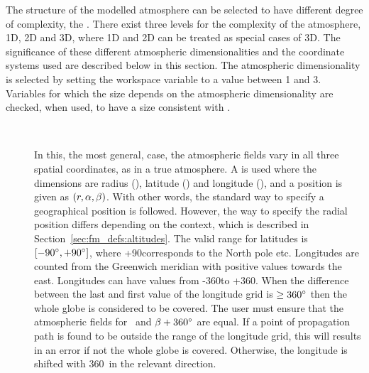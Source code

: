\label{sec:fm_defs:atmdim}

The structure of the modelled atmosphere can be selected to have different
degree of complexity, the . There
exist three levels for the complexity of the atmosphere, 1D, 2D and
3D, where 1D and 2D can be treated as special cases of 3D. The
significance of these different atmospheric dimensionalities and the
coordinate systems used are described below in this section. The
atmospheric dimensionality is selected by setting the workspace
variable  to a value between 1 and 3. Variables
for which the size depends on the atmospheric dimensionality are
checked, when used, to have a size consistent with
.

\begin{description}
  
\item[\,\,\,] In this, the most general, case, the
  atmospheric fields vary in all three spatial coordinates, as in a
  true atmosphere. A  is used where the
  dimensions are radius (\Rds), latitude (\Lat) and longitude (\Lon),
  and a position is given as $(r,\alpha,\beta)$. With other words, the
  standard way to specify a geographical position is followed.
  However, the way to specify the radial position differs depending on
  the context, which is described in
  Section~\ref{sec:fm_defs:altitudes}. The valid range for latitudes
  is $[-90^\circ,+90^\circ]$, where +90\degree corresponds to the
  North pole etc. Longitudes are counted from the Greenwich meridian
  with positive values towards the east. Longitudes can have values
  from -360\degree to +360\degree. When the difference between the
  last and first value of the longitude grid is $\geq 360^\circ$ then
  the whole globe is considered to be covered. The user must ensure
  that the atmospheric fields for \Lon\ and $\beta+360^\circ$ are
  equal. If a point of propagation path is found to be outside the
  range of the longitude grid, this will results in an error if not
  the whole globe is covered. Otherwise, the longitude is shifted with
  360\degree\ in the relevant direction.


\end{description}
